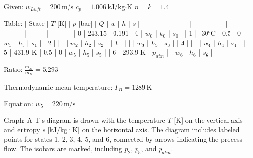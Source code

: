 Given:  
\( w_{Luft} = 200 \, \text{m/s} \)  
\( c_p = 1.006 \, \text{kJ/kg·K} \)  
\( n = k = 1.4 \)  

Table:  
| State | \( T \) [K] | \( p \) [bar] | \( Q \) | \( w \) | \( h \) | \( s \) |  
|-------|------------|---------------|---------|---------|---------|---------|  
| 0     | 243.15     | 0.191         | 0       | \( w_0 \) | \( h_0 \) | \( s_0 \) |  
| 1     | -30°C      | 0.5           | 0       | \( w_1 \) | \( h_1 \) | \( s_1 \) |  
| 2     |            |               |         | \( w_2 \) | \( h_2 \) | \( s_2 \) |  
| 3     |            |               |         | \( w_3 \) | \( h_3 \) | \( s_3 \) |  
| 4     |            |               |         | \( w_4 \) | \( h_4 \) | \( s_4 \) |  
| 5     | 431.9 K    | 0.5           | 0       | \( w_5 \) | \( h_5 \) | \( s_5 \) |  
| 6     | 293.9 K    | \( p_{atm} \) |         | \( w_6 \) | \( h_6 \) | \( s_6 \) |  

Ratio:  
\( \frac{\dot{m}_M}{\dot{m}_K} = 5.293 \)  

Thermodynamic mean temperature:  
\( T_B = 1289 \, \text{K} \)  

Equation:  
\( w_5 = 220 \, \text{m/s} \)  

Graph:  
A T-s diagram is drawn with the temperature \( T \) [K] on the vertical axis and entropy \( s \) [kJ/kg·K] on the horizontal axis. The diagram includes labeled points for states 1, 2, 3, 4, 5, and 6, connected by arrows indicating the process flow. The isobars are marked, including \( p_2 \), \( p_5 \), and \( p_{atm} \).